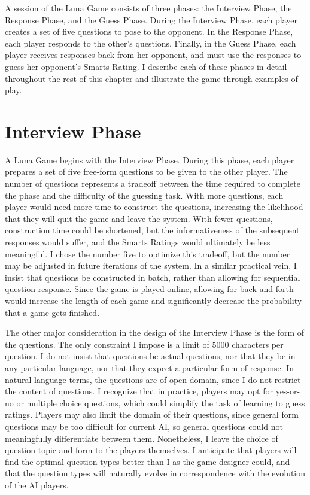 A session of the Luna Game consists of three phases: the Interview Phase, the Response Phase, and the Guess Phase. During the Interview Phase, each player creates a set of five questions to pose to the opponent. In the Response Phase, each player responds to the other's questions. Finally, in the Guess Phase, each player receives responses back from her opponent, and must use the responses to guess her opponent's Smarts Rating. I describe each of these phases in detail throughout the rest of this chapter and illustrate the game through examples of play.

\section{Interview Phase}

A Luna Game begins with the Interview Phase. During this phase, each player prepares a set of five free-form questions to be given to the other player. The number of questions represents a tradeoff between the time required to complete the phase and the difficulty of the guessing task. With more questions, each player would need more time to construct the questions, increasing the likelihood that they will quit the game and leave the system. With fewer questions, construction time could be shortened, but the informativeness of the subsequent responses would suffer, and the Smarts Ratings would ultimately be less meaningful. I chose the number five to optimize this tradeoff, but the number may be adjusted in future iterations of the system. In a similar practical vein, I insist that questions be constructed in batch, rather than allowing for sequential question-response. Since the game is played online, allowing for back and forth would increase the length of each game and significantly decrease the probability that a game gets finished.

The other major consideration in the design of the Interview Phase is the form of the questions. The only constraint I impose is a limit of $5000$ characters per question. I do not insist that questions be actual questions, nor that they be in any particular language, nor that they expect a particular form of response. In natural language terms, the questions are of open domain, since I do not restrict the content of questions. I recognize that in practice, players may opt for yes-or-no or multiple choice questions, which could simplify the task of learning to guess ratings. Players may also limit the domain of their questions, since general form questions may be too difficult for current AI, so general questions could not meaningfully differentiate between them. Nonetheless, I leave the choice of question topic and form to the players themselves. I anticipate that players will find the optimal question types better than I as the game designer could, and that the question types will naturally evolve in correspondence with the evolution of the AI players.

